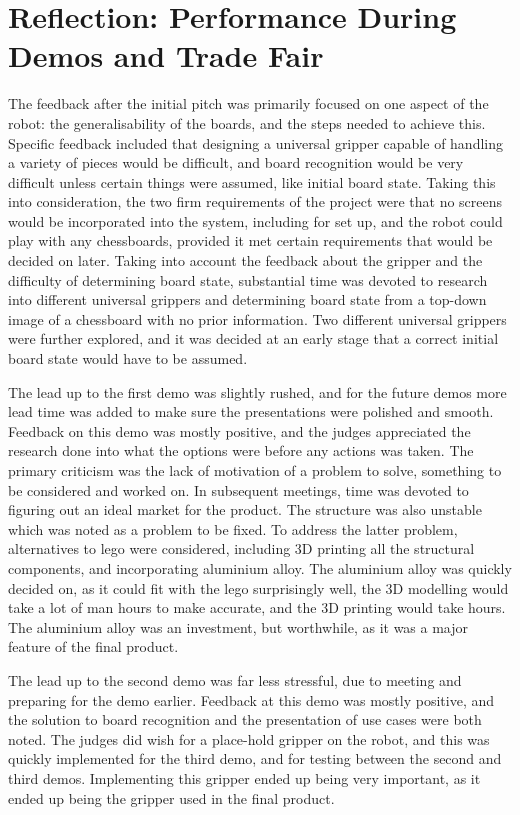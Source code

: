 \documentclass[onecolumn]{IEEEtran}
\begin{document}
\section{Reflection: Performance During Demos and Trade Fair}
The feedback after the initial pitch was primarily focused on one aspect of the robot: the generalisability of the boards, and the steps needed to achieve this. Specific feedback included that designing a universal gripper capable of handling a variety of pieces would be difficult, and board recognition would be very difficult unless certain things were assumed, like initial board state. Taking this into consideration, the two firm requirements of the project were that no screens would be incorporated into the system, including for set up, and the robot could play with any chessboards, provided it met certain requirements that would be decided on later. Taking into account the feedback about the gripper and the difficulty of determining board state, substantial time was devoted to research into different universal grippers and determining board state from a top-down image of a chessboard with no prior information. Two different universal grippers were further explored, and it was decided at an early stage that a correct initial board state would have to be assumed. \par
The lead up to the first demo was slightly rushed, and for the future demos more lead time was added to make sure the presentations were polished and smooth. Feedback on this demo was mostly positive, and the judges appreciated the research done into what the options were before any actions was taken. The primary criticism was the lack of motivation of a problem to solve, something to be considered and worked on. In subsequent meetings, time was devoted to figuring out an ideal market for the product. The structure was also unstable which was noted as a problem to be fixed. To address the latter problem, alternatives to lego were considered, including 3D printing all the structural components, and incorporating aluminium alloy. The aluminium alloy was quickly decided on, as it could fit with the lego surprisingly well, the 3D modelling would take a lot of man hours to make accurate, and the 3D printing would take hours. The aluminium alloy was an investment, but worthwhile, as it was a major feature of the final product. \par
The lead up to the second demo was far less stressful, due to meeting and preparing for the demo earlier. Feedback at this demo was mostly positive, and the solution to board recognition and the presentation of use cases were both noted. The judges did wish for a place-hold gripper on the robot, and this was quickly implemented for the third demo, and for testing between the second and third demos. Implementing this gripper ended up being very important, as it ended up being the gripper used in the final product. \par
\end{document}
